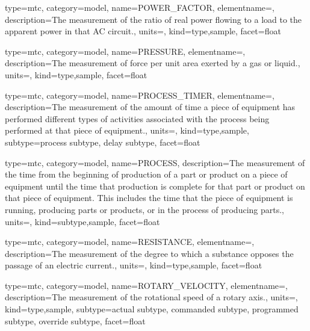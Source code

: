 {
  type=mtc,
  category=model,
  name={POWER\_FACTOR},
  elementname=,
  description={The measurement of the ratio of real power flowing to a load to the apparent power in that AC circuit.},
  units=,
  kind={type,sample},
  facet={\gls{float}}
}


{
  type=mtc,
  category=model,
  name={PRESSURE},
  elementname=,
  description={The measurement of force per unit area exerted by a gas or liquid.},
  units=,
  kind={type,sample},
  facet={\gls{float}}
}


{
  type=mtc,
  category=model,
  name={PROCESS\_TIMER},
  elementname=,
  description={The measurement of the amount of time a piece of equipment has performed different types of activities associated with the process being performed at that piece of equipment.},
  units=,
  kind={type,sample},
  subtype={\gls{process subtype}, \gls{delay subtype}},
  facet={\gls{float}}
}




{
  type=mtc,
  category=model,
  name={PROCESS},
  description={The measurement of the time from the beginning of production of a part or product on a piece of equipment until the time that production is complete for that part or product on that piece of equipment.  This includes the time that the piece of equipment is running, producing parts or products, or in the process of producing parts.},
  units=,
  kind={subtype,sample},
  facet={\gls{float}}
}


{
  type=mtc,
  category=model,
  name={RESISTANCE},
  elementname=,
  description={The measurement of the degree to which a substance opposes the passage of an electric current.},
  units=,
  kind={type,sample},
  facet={\gls{float}}
}


{
  type=mtc,
  category=model,
  name={ROTARY\_VELOCITY},
  elementname=,
  description={The measurement of the rotational speed of a rotary axis.},
  units=,
  kind={type,sample},
  subtype={\gls{actual subtype}, \gls{commanded subtype}, \gls{programmed subtype}, \gls{override subtype}},
  facet={\gls{float}}
}



